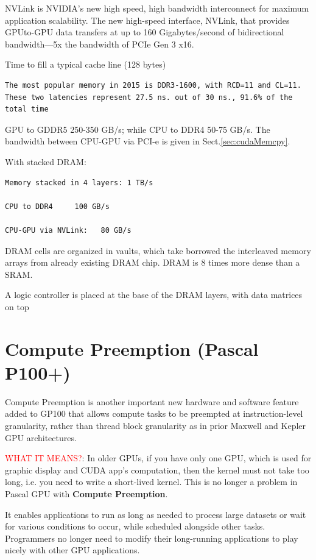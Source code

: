 NVLink is  NVIDIA’s new high speed, high bandwidth interconnect for maximum
application scalability.
The new high-speed interface, NVLink, that provides GPUto-GPU data transfers at
up to 160 Gigabytes/second of bidirectional bandwidth—5x the bandwidth of PCIe
Gen 3 x16.

Time to fill a typical cache line (128 bytes)
   
\begin{verbatim}
The most popular memory in 2015 is DDR3-1600, with RCD=11 and CL=11. 
These two latencies represent 27.5 ns. out of 30 ns., 91.6% of the total time
\end{verbatim}

GPU to GDDR5 250-350 GB/s; while CPU to DDR4 50-75 GB/s. The bandwidth between
CPU-GPU via PCI-e is given in Sect.\ref{sec:cudaMemcpy}.

With stacked DRAM:
\begin{verbatim}
Memory stacked in 4 layers: 1 TB/s

CPU to DDR4     100 GB/s

CPU-GPU via NVLink:   80 GB/s
\end{verbatim}

DRAM cells are organized in vaults, which take borrowed the interleaved memory
arrays from already existing DRAM chip. DRAM is 8 times more dense than a SRAM.

A logic controller is placed at the base of the DRAM layers, with data matrices on top



\section{Compute Preemption (Pascal P100+)}
\label{sec:Compute-Preemption}

Compute Preemption is another important new hardware and software feature added to GP100 that
allows compute tasks to be preempted at instruction-level granularity, rather than thread block
granularity as in prior Maxwell and Kepler GPU architectures.

\textcolor{red}{WHAT IT MEANS?}: In older GPUs, if you have only one GPU, which
is used for graphic display and CUDA app's computation, then the kernel must not
take too long, i.e. you need to write a short-lived kernel. This is no longer a
problem in Pascal GPU with {\bf Compute Preemption}.

It enables applications to run as long as needed to process large datasets or
wait for various conditions to occur, while scheduled alongside other tasks.
Programmers no longer need to modify their long-running applications to play
nicely with other GPU applications.



